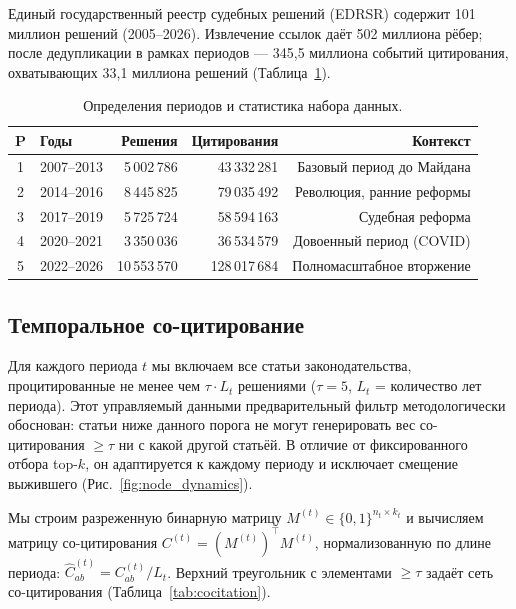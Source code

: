 \documentclass[11pt]{article}
\begin{document}
Единый государственный реестр судебных решений (EDRSR) содержит 101 миллион решений (2005--2026).
Извлечение ссылок даёт 502 миллиона рёбер; после дедупликации в рамках периодов — 345,5 миллиона событий цитирования, охватывающих 33,1 миллиона решений (Таблица~\ref{tab:periods}).

\begin{table}[t]
\centering
\small
\caption{Определения периодов и статистика набора данных.}
\label{tab:periods}
\begin{tabular}{@{}clrrr@{}}
\toprule
\textbf{P} & \textbf{Годы} & \textbf{Решения} & \textbf{Цитирования} & \textbf{Контекст} \\
\midrule
1 & 2007--2013 & 5\,002\,786 & 43\,332\,281 & Базовый период до Майдана \\
2 & 2014--2016 & 8\,445\,825 & 79\,035\,492 & Революция, ранние реформы \\
3 & 2017--2019 & 5\,725\,724 & 58\,594\,163 & Судебная реформа \\
4 & 2020--2021 & 3\,350\,036 & 36\,534\,579 & Довоенный период (COVID) \\
5 & 2022--2026 & 10\,553\,570 & 128\,017\,684 & Полномасштабное вторжение \\
\bottomrule
\end{tabular}
\end{table}

\subsection{Темпоральное со-цитирование}

Для каждого периода $t$ мы включаем все статьи законодательства, процитированные не менее чем $\tau \cdot L_t$ решениями ($\tau = 5$, $L_t$ = количество лет периода).
Этот управляемый данными предварительный фильтр методологически обоснован: статьи ниже данного порога не могут генерировать вес со-цитирования $\geq \tau$ ни с какой другой статьёй.
В отличие от фиксированного отбора top-$k$, он адаптируется к каждому периоду и исключает смещение выжившего (Рис.~\ref{fig:node_dynamics}).

Мы строим разреженную бинарную матрицу $M^{(t)} \in \{0,1\}^{n_t \times k_t}$ и вычисляем матрицу со-цитирования $C^{(t)} = (M^{(t)})^\top M^{(t)}$, нормализованную по длине периода: $\hat{C}^{(t)}_{ab} = C^{(t)}_{ab} / L_t$.
Верхний треугольник с элементами $\geq \tau$ задаёт сеть со-цитирования (Таблица~\ref{tab:cocitation}).
\end{document}
